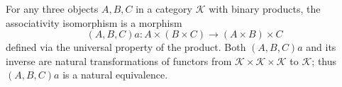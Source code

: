 For any three objects $A, B, C$ in a category $\mathcal{K}$ with binary products, the associativity isomorphism is a morphism
$$(A,B,C)a: A \times (B \times C) \to (A \times B) \times C$$
defined via the universal property of the product. Both $(A,B,C)a$ and its inverse are natural transformations of functors from $\mathcal{K} \times \mathcal{K} \times \mathcal{K}$ to $\mathcal{K}$; thus $(A,B,C)a$ is a natural equivalence.
